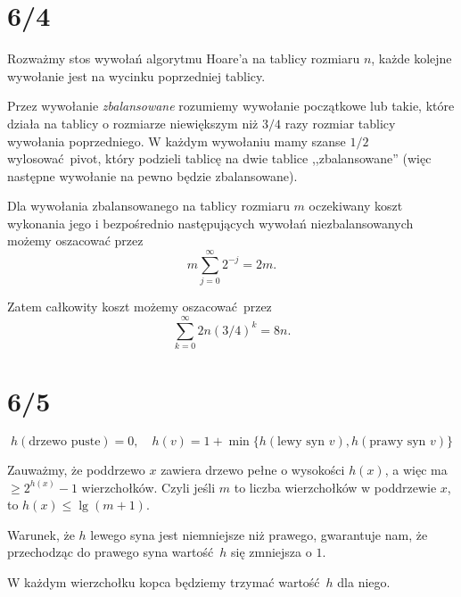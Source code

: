 \documentclass[a4paper, 12pt]{article}
\title{}
\author{Wiktor Kuchta}
\date{\vspace{-4ex}}
\newcommand{\+}{\enspace}
\begin{document}
\maketitle

\iffalse
\section*{6/1}

\begin{algorithm}
	\begin{algorithmic}

	\end{algorithmic}
\end{algorithm}
\fi

\section*{6/4}
Rozważmy stos wywołań algorytmu Hoare'a na tablicy rozmiaru $n$,
każde kolejne wywołanie jest na wycinku poprzedniej tablicy.

Przez wywołanie \textit{zbalansowane} rozumiemy wywołanie początkowe
lub takie, które działa na tablicy o rozmiarze niewiększym niż $3/4$ razy rozmiar
tablicy wywołania poprzedniego.
W każdym wywołaniu mamy szanse $1/2$ wylosować pivot, który podzieli
tablicę na dwie tablice ,,zbalansowane''
(więc następne wywołanie na pewno będzie zbalansowane).

Dla wywołania zbalansowanego na tablicy rozmiaru $m$ oczekiwany koszt
wykonania jego i bezpośrednio następujących wywołań niezbalansowanych
możemy oszacować przez
$$m∑_{j=0}^∞ 2^{-j} = 2m.$$

Zatem całkowity koszt możemy oszacować przez
$$∑_{k=0}^∞ 2n(3/4)^k = 8n.$$

\section*{6/5}
$$h(\text{drzewo puste}) = 0, \quad h(v) = 1 + \min \{ h(\text{lewy syn }v), h(\text{prawy syn }v)\}$$

Zauważmy, że poddrzewo $x$ zawiera drzewo pełne o wysokości $h(x)$,
a więc ma $≥2^{h(x)}-1$ wierzchołków.
Czyli jeśli $m$ to liczba wierzchołków w poddrzewie $x$, to
$h(x) ≤ \lg (m+1)$.

Warunek, że $h$ lewego syna jest niemniejsze niż prawego, gwarantuje nam,
że przechodząc do prawego syna wartość $h$ się zmniejsza o $1$.

W każdym wierzchołku kopca będziemy trzymać wartość $h$ dla niego.
\end{document}
